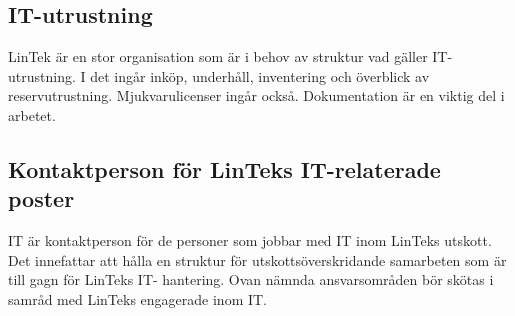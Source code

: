 \hypertarget{it-utrustning}{%
\subsection{IT-utrustning}\label{it-utrustning}}

LinTek är en stor organisation som är i behov av struktur vad gäller
IT-utrustning. I det ingår inköp, underhåll, inventering och överblick
av reservutrustning. Mjukvarulicenser ingår också. Dokumentation är en
viktig del i arbetet.

\hypertarget{kontaktperson-fuxf6r-linteks-it-relaterade-poster}{%
\subsection{Kontaktperson för LinTeks IT-relaterade
poster}\label{kontaktperson-fuxf6r-linteks-it-relaterade-poster}}

IT är kontaktperson för de personer som jobbar med IT inom LinTeks
utskott. Det innefattar att hålla en struktur för utskottsöverskridande
samarbeten som är till gagn för LinTeks IT- hantering. Ovan nämnda
ansvarsområden bör skötas i samråd med LinTeks engagerade inom IT.



